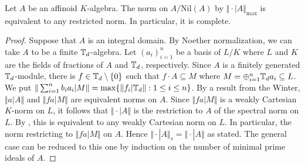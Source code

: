 \begin{proposition}\label{prop: maximum norm is complete}
    Let $A$ be an affinoid $K$-algebra. The norm on $A/\mathrm{Nil}(A)$ by $\Vert\cdot|A\Vert_{\max}$ is equivalent to any restricted norm. In particular, it is complete. 
\end{proposition}
\begin{proof}
    Suppose that $A$ is an integral domain. By Noether normalization, we can take $A$ to be a finite $\mathbb{T}_{d}$-algebra. Let $(a_{i})_{i=1}^{n}$ be a basis of $L/K$ where $L$ and $K$ are the fields of fractions of $A$ and $\mathbb{T}_{d}$, respectively. Since $A$ is a finitely generated $\mathbb{T}_{d}$-module, there is $f\in\mathbb{T}_{d}\setminus\{0\}$ such that $f\cdot A\subseteq M$ where $M=\oplus_{i=1}^{n}\mathbb{T}_{d}a_{i}\subseteq L$. We put $\Vert\sum_{i=1}^{n}b_{i}a_{i}|M\Vert=\max\{\Vert f_{i}|\mathbb{T}_{d}\Vert:1\leq i\leq n\}$. By a result from the Winter, $\Vert a|A\Vert$ and $\Vert fa|M\Vert$ are equivalent norms on $A$. Since $\Vert fa|M\Vert$ is a weakly Cartesian $K$-norm on $L$, it follows that $\Vert\cdot|A\Vert$ is the restriction to $A$ of the spectral norm on $L$. By , this is equivalent to any weakly Cartesian norm on $L$. In particular, the norm restricting to $\Vert fa|M\Vert$ on $A$. Hence $\Vert\cdot|A\Vert_{s}=\Vert\cdot|A\Vert$ as stated. The general case can be reduced to this one by induction on the number of minimal prime ideals of $A$. 
\end{proof}